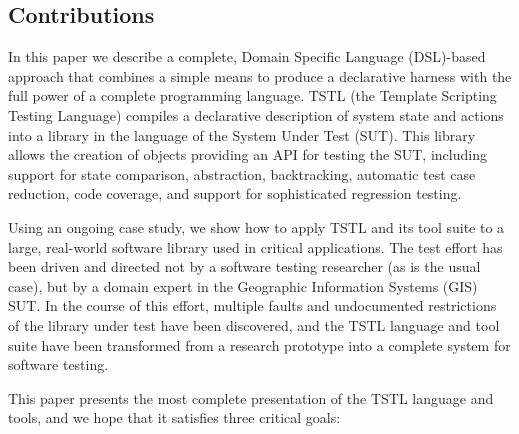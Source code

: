 \subsection{Contributions}

In this paper we describe a complete, Domain Specific Language (DSL)-based approach that combines
a simple means to produce a declarative harness with the full power of
a complete programming language.  TSTL (the Template Scripting Testing
Language) compiles a declarative description of system state and
actions into a library in the language of the System Under Test
(SUT).  This library allows the creation of objects providing an API
for testing the SUT, including support for state comparison,
abstraction, backtracking, automatic test case reduction, code coverage, and support
for sophisticated regression testing.

Using an ongoing case study,
we show how to apply TSTL and its tool suite to a large, real-world software
library used in critical applications.  The test effort has been driven and directed not by a
software testing researcher (as is the usual case), but by a domain
expert in the Geographic Information Systems (GIS) SUT.  In the
course of this effort, multiple faults and undocumented restrictions of the library
under test have been discovered, and the TSTL language and tool suite have
been transformed from a research prototype into a complete system for
software testing.

This paper presents the most complete presentation of the TSTL
language and tools, and we hope that it satisfies three critical goals:

